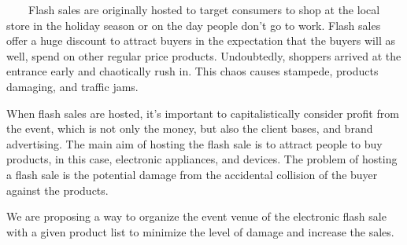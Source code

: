 \ \ \ \ Flash sales are originally hosted to target consumers to shop at the local store in the holiday season or on the day people don’t go to work. Flash sales offer a huge discount to attract buyers in the expectation that the buyers will as well, spend on other regular price products. Undoubtedly, shoppers arrived at the entrance early and chaotically rush in. This chaos causes stampede, products damaging, and traffic jams. \newline \par
When flash sales are hosted, it’s important to capitalistically consider profit from the event, which is not only the money, but also the client bases, and brand advertising. The main aim of hosting the flash sale is to attract people to buy products, in this case, electronic appliances, and devices. The problem of hosting a flash sale is the potential damage from the accidental collision of the buyer against the products. \newline \par
We are proposing a way to organize the event venue of the electronic flash sale with a given product list to minimize the level of damage and increase the sales. 